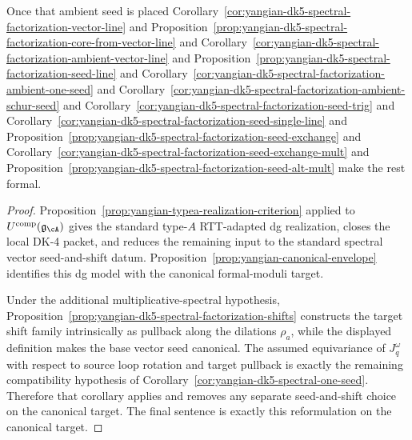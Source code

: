 \begin{corollary}
Once
that ambient seed is placed
Corollary~\ref{cor:yangian-dk5-spectral-factorization-vector-line}
and Proposition~\ref{prop:yangian-dk5-spectral-factorization-core-from-vector-line}
and Corollary~\ref{cor:yangian-dk5-spectral-factorization-ambient-vector-line}
and Proposition~\ref{prop:yangian-dk5-spectral-factorization-seed-line}
and Corollary~\ref{cor:yangian-dk5-spectral-factorization-ambient-one-seed}
and Corollary~\ref{cor:yangian-dk5-spectral-factorization-ambient-schur-seed}
and Corollary~\ref{cor:yangian-dk5-spectral-factorization-seed-trig}
and Corollary~\ref{cor:yangian-dk5-spectral-factorization-seed-single-line}
and Proposition~\ref{prop:yangian-dk5-spectral-factorization-seed-exchange}
and Corollary~\ref{cor:yangian-dk5-spectral-factorization-seed-exchange-mult}
and Proposition~\ref{prop:yangian-dk5-spectral-factorization-seed-alt-mult}
make the rest formal.
\end{corollary}

\begin{proof}
Proposition~\ref{prop:yangian-typea-realization-criterion} applied to
\(U^{\mathrm{comp}}(\mathfrak{g}_{\cA})\) gives the standard type-$A$
RTT-adapted dg realization, closes the local DK-4 packet, and reduces
the remaining input to the standard spectral vector seed-and-shift
datum.  Proposition~\ref{prop:yangian-canonical-envelope} identifies
this dg model with the canonical formal-moduli target.

Under the additional multiplicative-spectral hypothesis,
Proposition~\ref{prop:yangian-dk5-spectral-factorization-shifts}
constructs the target shift family intrinsically as pullback along the
dilations \(\rho_a\), while the displayed definition makes the base
vector seed canonical.  The assumed equivariance of \(J_q^\omega\)
with respect to source loop rotation and target pullback is exactly the
remaining compatibility hypothesis of
Corollary~\ref{cor:yangian-dk5-spectral-one-seed}.  Therefore that
corollary applies and removes any separate seed-and-shift choice on the
canonical target.  The final sentence is exactly this reformulation on
the canonical target.
\end{proof}

